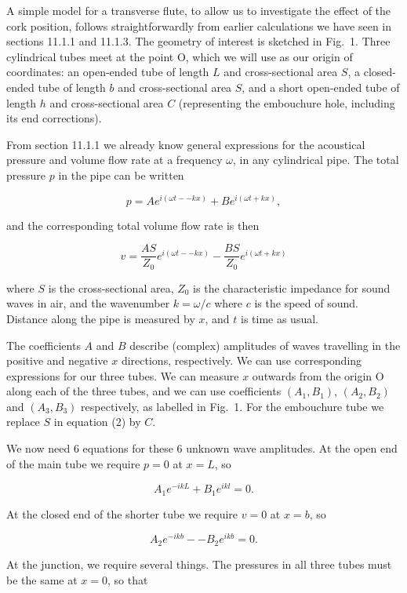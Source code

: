   A simple model for a transverse flute, to allow us to investigate the effect 
  of the cork position, follows straightforwardly from earlier calculations we 
  have seen in sections 11.1.1 and 11.1.3. The geometry of interest is sketched 
  in Fig.\ 1. Three cylindrical tubes meet at the point O, which we will use as 
  our origin of coordinates: an open-ended tube of length $L$ and 
  cross-sectional area $S$, a closed-ended tube of length $b$ and 
  cross-sectional area $S$, and a short open-ended tube of length $h$ and 
  cross-sectional area $C$ (representing the embouchure hole, including its end 
  corrections). 

  From section 11.1.1 we already know general expressions for the acoustical 
  pressure and volume flow rate at a frequency $\omega$, in any cylindrical 
  pipe. The total pressure $p$ in the pipe can be written 

  $$p=Ae^{i(\omega t -- kx)}+Be^{i(\omega t + kx)} , \tag{1}$$ 

  and the corresponding total volume flow rate is then 

  $$v=\dfrac{AS}{Z_0}e^{i(\omega t -- kx)}-\dfrac{BS}{Z_0}e^{i(\omega t + kx)} 
  \tag{2}$$ 

  where $S$ is the cross-sectional area, $Z_0$ is the characteristic impedance 
  for sound waves in air, and the wavenumber $k=\omega/c$ where $c$ is the 
  speed of sound. Distance along the pipe is measured by $x$, and $t$ is time 
  as usual. 

  The coefficients $A$ and $B$ describe (complex) amplitudes of waves 
  travelling in the positive and negative $x$ directions, respectively. We can 
  use corresponding expressions for our three tubes. We can measure $x$ 
  outwards from the origin O along each of the three tubes, and we can use 
  coefficients $(A_1,B_1)$, $(A_2,B_2)$ and $(A_3,B_3)$ respectively, as 
  labelled in Fig.\ 1. For the embouchure tube we replace $S$ in equation (2) 
  by $C$. 

  We now need 6 equations for these 6 unknown wave amplitudes. At the open end 
  of the main tube we require $p=0$ at $x=L$, so 

  $$A_1 e^{-ikL} + B_1 e^{ikl} =0. \tag{3}$$ 

  At the closed end of the shorter tube we require $v=0$ at $x=b$, so 

  $$A_2 e^{-ikb} -- B_2 e^{ikb} =0. \tag{4}$$ 

  At the junction, we require several things. The pressures in all three tubes 
  must be the same at $x=0$, so that 

